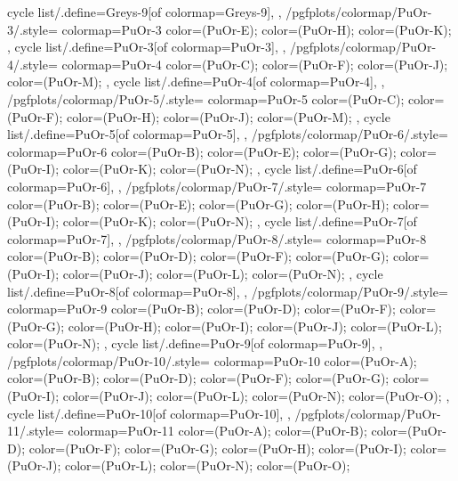 {{    cycle list/.define={Greys-9}{[of colormap=Greys-9]},
  },
  /pgfplots/colormap/PuOr-3/.style={
    colormap={PuOr-3}{
      color=(PuOr-E);
      color=(PuOr-H);
      color=(PuOr-K);
    },
    cycle list/.define={PuOr-3}{[of colormap=PuOr-3]},
  },
  /pgfplots/colormap/PuOr-4/.style={
    colormap={PuOr-4}{
      color=(PuOr-C);
      color=(PuOr-F);
      color=(PuOr-J);
      color=(PuOr-M);
    },
    cycle list/.define={PuOr-4}{[of colormap=PuOr-4]},
  },
  /pgfplots/colormap/PuOr-5/.style={
    colormap={PuOr-5}{
      color=(PuOr-C);
      color=(PuOr-F);
      color=(PuOr-H);
      color=(PuOr-J);
      color=(PuOr-M);
    },
    cycle list/.define={PuOr-5}{[of colormap=PuOr-5]},
  },
  /pgfplots/colormap/PuOr-6/.style={
    colormap={PuOr-6}{
      color=(PuOr-B);
      color=(PuOr-E);
      color=(PuOr-G);
      color=(PuOr-I);
      color=(PuOr-K);
      color=(PuOr-N);
    },
    cycle list/.define={PuOr-6}{[of colormap=PuOr-6]},
  },
  /pgfplots/colormap/PuOr-7/.style={
    colormap={PuOr-7}{
      color=(PuOr-B);
      color=(PuOr-E);
      color=(PuOr-G);
      color=(PuOr-H);
      color=(PuOr-I);
      color=(PuOr-K);
      color=(PuOr-N);
    },
    cycle list/.define={PuOr-7}{[of colormap=PuOr-7]},
  },
  /pgfplots/colormap/PuOr-8/.style={
    colormap={PuOr-8}{
      color=(PuOr-B);
      color=(PuOr-D);
      color=(PuOr-F);
      color=(PuOr-G);
      color=(PuOr-I);
      color=(PuOr-J);
      color=(PuOr-L);
      color=(PuOr-N);
    },
    cycle list/.define={PuOr-8}{[of colormap=PuOr-8]},
  },
  /pgfplots/colormap/PuOr-9/.style={
    colormap={PuOr-9}{
      color=(PuOr-B);
      color=(PuOr-D);
      color=(PuOr-F);
      color=(PuOr-G);
      color=(PuOr-H);
      color=(PuOr-I);
      color=(PuOr-J);
      color=(PuOr-L);
      color=(PuOr-N);
    },
    cycle list/.define={PuOr-9}{[of colormap=PuOr-9]},
  },
  /pgfplots/colormap/PuOr-10/.style={
    colormap={PuOr-10}{
      color=(PuOr-A);
      color=(PuOr-B);
      color=(PuOr-D);
      color=(PuOr-F);
      color=(PuOr-G);
      color=(PuOr-I);
      color=(PuOr-J);
      color=(PuOr-L);
      color=(PuOr-N);
      color=(PuOr-O);
    },
    cycle list/.define={PuOr-10}{[of colormap=PuOr-10]},
  },
  /pgfplots/colormap/PuOr-11/.style={
    colormap={PuOr-11}{
      color=(PuOr-A);
      color=(PuOr-B);
      color=(PuOr-D);
      color=(PuOr-F);
      color=(PuOr-G);
      color=(PuOr-H);
      color=(PuOr-I);
      color=(PuOr-J);
      color=(PuOr-L);
      color=(PuOr-N);
      color=(PuOr-O);
}}}
